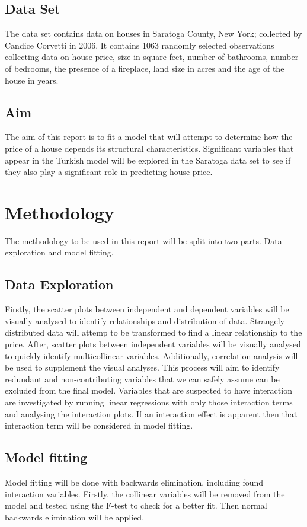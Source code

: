 \documentclass[10pt,A4,makeidx]{article}
\begin{document}
  \subsection{Data Set}
  The data set contains data on houses in Saratoga County, New York; collected by
  Candice Corvetti in 2006. It contains 1063 randomly selected observations collecting
  data on house price, size in square feet, number of bathrooms, number of bedrooms,
  the presence of a fireplace, land size in acres and the age of the house in years.
  
  \subsection{Aim}
  The aim of this report is to fit a model that will attempt to determine how 
  the price of a house depends its structural characteristics. Significant 
  variables that appear in the Turkish model will be explored in the Saratoga 
  data set to see if they also play a significant role in predicting house price.

\section{Methodology}
The methodology to be used in this report will be split into two parts. Data
exploration and model fitting.
  \subsection{Data Exploration}
  Firstly, the scatter plots between independent and dependent variables will be 
  visually analysed to identify relationships and distribution of data. Strangely
  distributed data will attemp to be transformed to find a linear relationship to 
  the price. After, scatter plots between independent variables will be visually analysed to quickly 
  identify multicollinear variables. Additionally, correlation analysis will be used to 
  supplement the visual analyses. This process will aim to identify redundant and 
  non-contributing variables that we can safely assume can be excluded from the 
  final model.  
  Variables that are suspected to have interaction are investigated by running linear 
  regressions with only those interaction terms and analysing the interaction plots.
  If an interaction effect is apparent then that interaction term will be considered
  in model fitting.
  \subsection{Model fitting}
  Model fitting will be done with backwards elimination, including found interaction 
  variables. Firstly, the collinear variables will be removed from the model and 
  tested using the F-test to check for a better fit. Then normal backwards elimination 
  will be applied.
\end{document}
